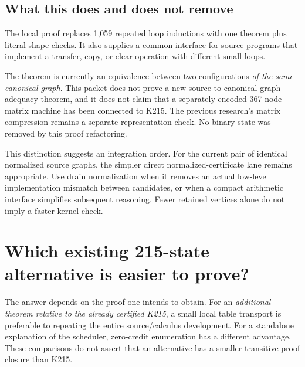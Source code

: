 \documentclass[11pt]{article}
\begin{document}
\subsection{What this does and does not remove}

The local proof replaces 1,059 repeated loop inductions with one theorem plus literal shape checks. It also supplies a common interface for source programs that implement a transfer, copy, or clear operation with different small loops.

The theorem is currently an equivalence between two configurations \emph{of the same canonical graph}. This packet does not prove a new source-to-canonical-graph adequacy theorem, and it does not claim that a separately encoded 367-node matrix machine has been connected to K215. The previous research's matrix compression remains a separate representation check. No binary state was removed by this proof refactoring.

This distinction suggests an integration order. For the current pair of identical normalized source graphs, the simpler direct normalized-certificate lane remains appropriate. Use drain normalization when it removes an actual low-level implementation mismatch between candidates, or when a compact arithmetic interface simplifies subsequent reasoning. Fewer retained vertices alone do not imply a faster kernel check.

\section{Which existing 215-state alternative is easier to prove?}

The answer depends on the proof one intends to obtain. For an \emph{additional theorem relative to the already certified K215}, a small local table transport is preferable to repeating the entire source/calculus development. For a standalone explanation of the scheduler, zero-credit enumeration has a different advantage. These comparisons do not assert that an alternative has a smaller transitive proof closure than K215.
\end{document}
